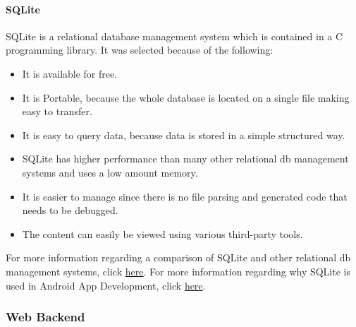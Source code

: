 \documentclass[11pt,a4paper,titlepage]{article}
\begin{document}
			\paragraph{SQLite}
				SQLite is a relational database management system which is contained in a C programming library. It was selected because of the following: 
					\begin{itemize}	
						\item It is available for free. 
						\item It is Portable, because the whole database is located on a single file making easy to transfer.
						\item It is easy to query data, because data is stored in a simple structured way.
						\item SQLite has higher performance than many other relational db management systems and uses a low amount memory.
						\item It is easier to manage since there is no file parsing and generated code that needs to be debugged. 
						\item The content can easily be viewed using various third-party tools.
					\end{itemize}
For more information regarding a comparison of SQLite and other relational db management systems, click \href{https://www.digitalocean.com/community/tutorials/sqlite-vs-mysql-vs-postgresql-a-comparison-of-relational-database-management-systems}{here}. \newline
For more information regarding why SQLite is used in Android App Development, click \href{http://www.quora.com/Why-should-we-use-SQLite-in-Android-development}{here}. \newline
		\subsubsection{Web Backend}
\end{document}
